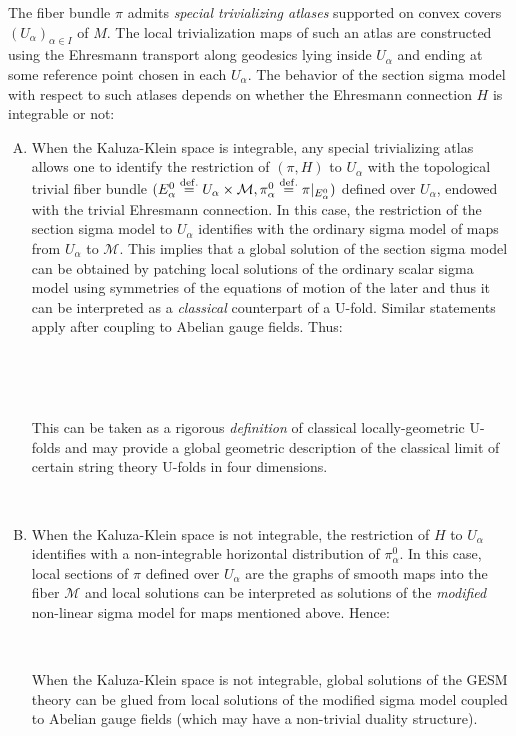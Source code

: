 \documentclass[10pt, cmp, numbook, final, a4paper]{svjour}
\newcommand{\eqdef}{\stackrel{{\rm def.}}{=}}
\newcommand{\cM}{\mathcal{M}}
\begin{document}
The fiber bundle $\pi$ admits {\em special trivializing atlases}
supported on convex covers $(U_\alpha)_{\alpha\in I}$ of $M$. The
local trivialization maps of such an atlas are constructed using the
Ehresmann transport along geodesics lying inside $U_\alpha$ and ending
at some reference point chosen in each $U_\alpha$. The behavior of the
section sigma model with respect to such atlases depends on whether
the Ehresmann connection $H$ is integrable or not:
\begin{enumerate}[A.]
	
\itemsep 0.0em
	
	
\item When the Kaluza-Klein space is integrable, any special
  trivializing atlas allows one to identify the restriction of
  $(\pi,H)$ to $U_\alpha$ with the topological trivial fiber bundle
  $(E^0_{\alpha}\eqdef U_\alpha\times \cM, \pi^0_{\alpha}\eqdef
  \pi|_{E_\alpha^0})$ defined over $U_\alpha$, endowed with the
  trivial Ehresmann connection. In this case, the restriction of the
  section sigma model to $U_\alpha$ identifies with the ordinary sigma
  model of maps from $U_\alpha$ to $\cM$. This implies that a global
  solution of the section sigma model can be obtained by patching
  local solutions of the ordinary scalar sigma model using symmetries
  of the equations of motion of the later and thus it can be
  interpreted as a {\em classical} counterpart of a U-fold. Similar
  statements apply after coupling to Abelian gauge fields. Thus:
	
\
	
	
\
	
\noindent This can be taken as a rigorous {\em definition} of
classical locally-geometric U-folds and may provide a global geometric
description of the classical limit of certain string theory U-folds in
four dimensions.
	
\

\item When the Kaluza-Klein space is not integrable, the
  restriction of $H$ to $U_\alpha$ identifies with a non-integrable
  horizontal distribution of $\pi^0_\alpha$. In this case, local
  sections of $\pi$ defined over $U_\alpha$ are the graphs of smooth
  maps into the fiber $\cM$ and local solutions can be interpreted as
  solutions of the {\em modified} non-linear sigma model for maps
  mentioned above. Hence:
	
\
	
\noindent When the Kaluza-Klein space is not integrable,
global solutions of the GESM theory can be glued from local solutions
of the modified sigma model coupled to Abelian gauge fields (which may
have a non-trivial duality structure).
	
\
	
\end{enumerate}
\end{document}
